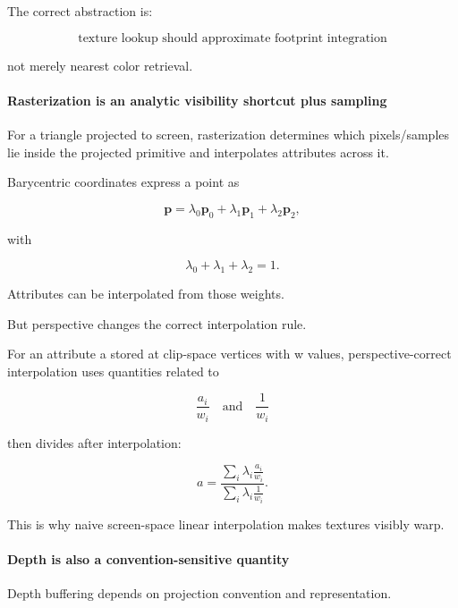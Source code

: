 The correct abstraction is:

\[
\boxed{
\text{texture lookup should approximate footprint integration}
}
\]

not merely nearest color retrieval.

\paragraph{Rasterization is an analytic visibility shortcut plus sampling}\label{03-visual-computing-i-ch001-rasterization-is-an-analytic-visibility-shortcut-plus-sampling}

\hypertarget{03-visual-computing-i-ch001-rasterization-is-an-analytic-visibility-shortcut-plus-sampling}{}

For a triangle projected to screen, rasterization determines which pixels/samples lie inside the projected primitive and interpolates attributes across it.

Barycentric coordinates express a point as

\[
\mathbf p
=
\lambda_0\mathbf p_0
+
\lambda_1\mathbf p_1
+
\lambda_2\mathbf p_2,
\]

with

\[
\lambda_0+\lambda_1+\lambda_2=1.
\]

Attributes can be interpolated from those weights.

But perspective changes the correct interpolation rule.

For an attribute a stored at clip-space vertices with w values, perspective-correct interpolation uses quantities related to

\[
\frac{a_i}{w_i}
\quad\text{and}\quad
\frac{1}{w_i}
\]

then divides after interpolation:

\[
a
=
\frac{
\sum_i \lambda_i \frac{a_i}{w_i}
}{
\sum_i \lambda_i \frac{1}{w_i}
}.
\]

This is why naive screen-space linear interpolation makes textures visibly warp.

\paragraph{Depth is also a convention-sensitive quantity}\label{03-visual-computing-i-ch001-depth-is-also-a-convention-sensitive-quantity}

\hypertarget{03-visual-computing-i-ch001-depth-is-also-a-convention-sensitive-quantity}{}

Depth buffering depends on projection convention and representation.

